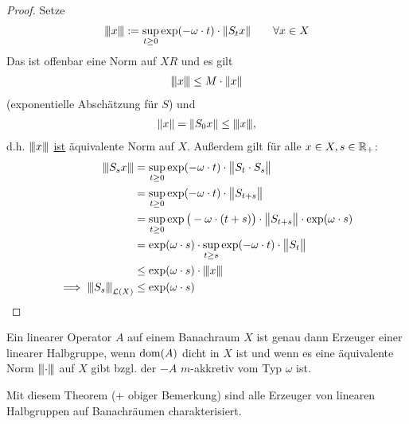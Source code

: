 \begin{proof}
	Setze
	\begin{align*}
		\Vertiii{x}:=\sup\limits_{t\geq0}\exp(-\omega\cdot t)\cdot\Vert S_t x\Vert\qquad\forall x\in X
	\end{align*}
	Das ist offenbar eine Norm auf $XR$ und es gilt 
	\begin{align*}
		\Vertiii{x}\leq M\cdot\Vert x\Vert
	\end{align*}
	(exponentielle Abschätzung für $S$) und 
	\begin{align*}
		\Vert x\Vert=\Vert S_0 x\Vert\leq\Vertiii{x},
	\end{align*}
	d.h. $\Vertiii{x}$ \underline{ist} äquivalente Norm auf $X$. 
	Außerdem gilt für alle $x\in X, s\in\R_+$:
	\begin{align*}
		\Vertiii{S_s x}
		&=\sup\limits_{t\geq0}\exp(-\omega\cdot t)\cdot\big\Vert S_t\cdot S_s\big\Vert\\
		&=\sup\limits_{t\geq0}\exp(-\omega\cdot t)\cdot\big\Vert S_{t+s}\big\Vert\\
		&=\sup\limits_{t\geq0}\exp\big(-\omega\cdot(t+s)\big)\cdot\big\Vert S_{t+s}\big\Vert\cdot\exp(\omega\cdot s)\\
		&=\exp(\omega\cdot s)\cdot\sup\limits_{t\geq s}\exp(-\omega\cdot t)\cdot\big\Vert S_{t}\big\Vert\\\
		&\leq\exp(\omega\cdot s)\cdot\Vertiii{x}\\
		\implies \Vertiii{S_s}_{\L(X)}&\leq\exp(\omega\cdot s)
	\end{align*}
\end{proof}

\begin{theorem}[Ohne Namen]\enter
	Ein linearer Operator $A$ auf einem Banachraum $X$ ist genau dann Erzeuger einer linearer Halbgruppe, 
	wenn $\dom(A)$ dicht in $X$ ist und wenn es eine äquivalente Norm $\Vertiii{\cdot}$ auf $X$ gibt bzgl. der $-A$ $m$-akkretiv vom Typ $\omega$ ist.
\end{theorem}

Mit diesem Theorem (+ obiger Bemerkung) sind alle Erzeuger von linearen Halbgruppen auf Banachräumen charakterisiert.

